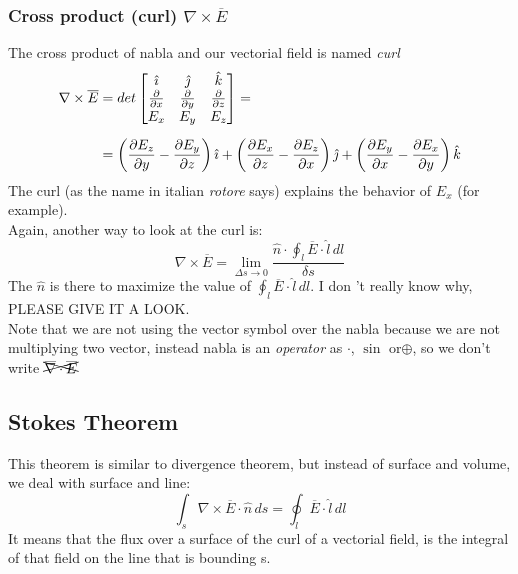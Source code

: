 \subsubsection*{Cross product (curl) $\nabla \times \overline{E}$}
The cross product of nabla and our vectorial field is named \emph{curl}
\begin{align}
    \begin{split}
        \nabla\times \overline{E}&=det
        \left[ \begin{matrix}
        \hat{\imath} & \hat{\jmath} & \hat{\mathnormal{k}}\\
        \frac{\partial}{\partial x} & \frac{\partial}{\partial y} & \frac{\partial}{\partial z}\\
        E_x & E_y & E_z
        \end{matrix}\right]=\\[5pt]
        &=\left(\frac{\partial E_z}{\partial y} - \frac{\partial E_y}{\partial z}\right)\hat{\imath}+
        \left(\frac{\partial E_x}{\partial z} - \frac{\partial E_z}{\partial x}\right)\hat{\jmath}+
        \left(\frac{\partial E_y}{\partial x} - \frac{\partial E_x}{\partial y}\right)\hat{\mathnormal{k}}
    \end{split}
\end{align}
The curl (as the name in italian \emph{rotore} says) explains the behavior of $E_x$ (for example).\\
Again, another way to look at the curl is:
\begin{equation}
\nabla \times \overline{E}=\lim_{\Delta s \rightarrow 0}\frac{\hat{n}\cdot\oint_l \overline{E}\cdot \hat{l}\,dl}{\delta s}
\end{equation}
The $\hat{n}$ is there to maximize the value of $\oint_l \overline{E}\cdot \hat{l}\,dl$. I don
't really know why, PLEASE GIVE IT A LOOK.\\
Note that we are not using the vector symbol over the nabla because we are not multiplying two vector, instead nabla is an \emph{operator} as $\cdot$, $\sin$ or$\oplus$, so we don't write $\xcancel{\overline{\nabla}\cdot\overline{E}}$
\subsection*{Stokes Theorem}
This theorem is similar to divergence theorem, but instead of surface and volume, we deal with surface and line:
\begin{equation}\label{eq:stokes_eq}
\int_s \nabla\times \overline{E}\cdot \hat{n}\,ds=\oint_l\overline{E}\cdot\hat{l}\,dl
\end{equation}
It means that the flux over a surface of the curl of a vectorial field, is the integral of that field on the line that is bounding s.

